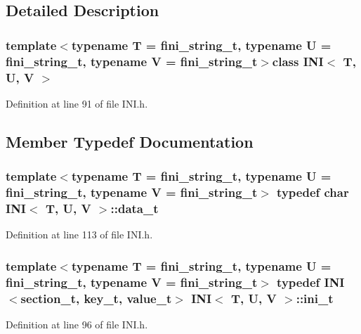 \subsection{Detailed Description}
\subsubsection*{template$<$typename T = fini\+\_\+string\+\_\+t, typename U = fini\+\_\+string\+\_\+t, typename V = fini\+\_\+string\+\_\+t$>$class I\+N\+I$<$ T, U, V $>$}



Definition at line 91 of file I\+N\+I.\+h.



\subsection{Member Typedef Documentation}
\hypertarget{class_i_n_i_a611e44f4d3abb28d901f7e2aaf183811}{}
\subsubsection[{data\+\_\+t}]{\setlength{\rightskip}{0pt plus 5cm}template$<$typename T = fini\+\_\+string\+\_\+t, typename U = fini\+\_\+string\+\_\+t, typename V = fini\+\_\+string\+\_\+t$>$ typedef char {\bf I\+N\+I}$<$ T, U, V $>$\+::{\bf data\+\_\+t}}\label{class_i_n_i_a611e44f4d3abb28d901f7e2aaf183811}


Definition at line 113 of file I\+N\+I.\+h.

\hypertarget{class_i_n_i_a510efd26938d16fcaac1b3b8bdd47f34}{}
\subsubsection[{ini\+\_\+t}]{\setlength{\rightskip}{0pt plus 5cm}template$<$typename T = fini\+\_\+string\+\_\+t, typename U = fini\+\_\+string\+\_\+t, typename V = fini\+\_\+string\+\_\+t$>$ typedef {\bf I\+N\+I}$<${\bf section\+\_\+t}, {\bf key\+\_\+t}, {\bf value\+\_\+t}$>$ {\bf I\+N\+I}$<$ T, U, V $>$\+::{\bf ini\+\_\+t}}\label{class_i_n_i_a510efd26938d16fcaac1b3b8bdd47f34}


Definition at line 96 of file I\+N\+I.\+h.

\hypertarget{class_i_n_i_acfa659efbac1eb0c62c1a910b0b09541}{}

